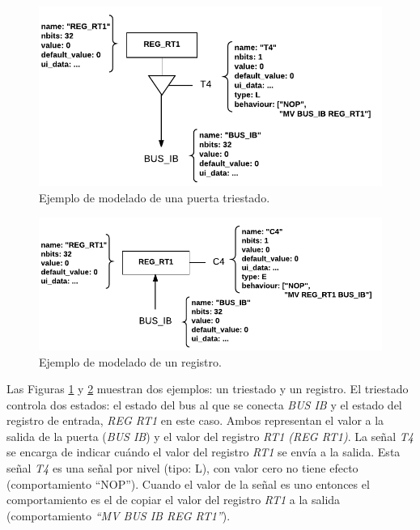 \begin{figure}[htbp]
 	\centering
 	\includegraphics[width=14cm]{figures/hardware_example_tristate}
 	\caption{Ejemplo de modelado de una puerta triestado.}
	\label{fig:hardware_tristate_example}
\end{figure}

\begin{figure}[htbp]
 	\centering
 	\includegraphics[width=14cm]{figures/hardware_example_register}
 	\caption{Ejemplo de modelado de un registro.}
	\label{fig:hardware_register_example}
\end{figure}

Las Figuras \ref{fig:hardware_tristate_example} y \ref{fig:hardware_register_example} muestran dos ejemplos: un triestado y un registro.
El triestado controla dos estados: el estado del bus al que se conecta \emph{BUS IB} y el estado del registro de entrada, \emph{REG RT1} en este caso. Ambos representan el valor a la salida de la puerta (\emph{BUS IB}) y el valor del registro \emph{RT1 (REG RT1)}. La señal \emph{T4} se encarga de indicar cuándo el valor del registro \emph{RT1} se envía a la salida. Esta señal \emph{T4} es una señal por nivel (tipo: L), con valor cero no tiene efecto (comportamiento ``NOP''). Cuando el valor de la señal es uno entonces el comportamiento es el de copiar el valor del registro \emph{RT1} a la salida (comportamiento \emph{``MV BUS IB REG RT1''}).

